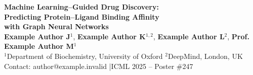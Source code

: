 \documentclass[a0paper,portrait]{article}
\begin{document}

\vspace*{-1cm}
\begin{center}
  {\color{white}\fontsize{80}{96}\selectfont\bfseries
  Machine Learning--Guided Drug Discovery:\\[0.4cm]
  Predicting Protein--Ligand Binding Affinity\\[0.4cm]
  with Graph Neural Networks}\\[2cm]
  {\color{white}\fontsize{40}{48}\selectfont
  \textbf{Example Author J}$^1$, \textbf{Example Author K}$^{1,2}$, \textbf{Example Author L}$^2$, \textbf{Prof. Example Author M}$^1$}\\[1cm]
  {\color{white!85}\fontsize{34}{42}\selectfont
  $^1$Department of Biochemistry, University of Oxford \quad\quad
  $^2$DeepMind, London, UK}\\[0.6cm]
  {\color{accentblue!40}\fontsize{30}{36}\selectfont
  Contact: author@example.invalid \quad|\quad ICML 2025 -- Poster \#247}
\end{center}

\vspace{3cm}
\end{document}
